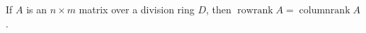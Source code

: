 If $A$ is an $n \times m$ matrix over a division ring $D$, then $\operatorname{row rank} A = \operatorname{column rank} A$.

